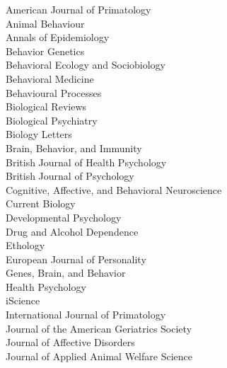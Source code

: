 \documentclass[11pt]{article}
\begin{document}
\begin{minipage}[t]{0.49\linewidth}
American Journal of Primatology \\
Animal Behaviour \\
Annals of Epidemiology \\
Behavior Genetics \\
Behavioral Ecology and Sociobiology \\
Behavioral Medicine \\
Behavioural Processes \\
Biological Reviews \\
Biological Psychiatry \\
Biology Letters \\
Brain, Behavior, and Immunity \\
British Journal of Health Psychology \\
British Journal of Psychology \\
Cognitive, Affective, and Behavioral Neuroscience \\
Current Biology \\
Developmental Psychology \\
Drug and Alcohol Dependence \\
Ethology \\
European Journal of Personality \\
Genes, Brain, and Behavior \\
Health Psychology \\
iScience \\
International Journal of Primatology \\
Journal of the American Geriatrics Society \\
Journal of Affective Disorders \\
Journal of Applied Animal Welfare Science

\end{minipage}
\hfill
\end{document}
